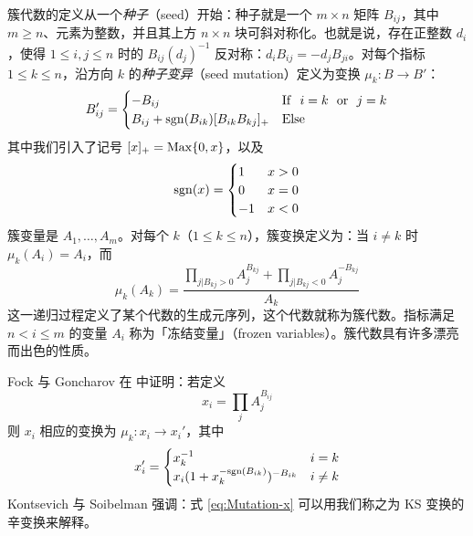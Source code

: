 簇代数的定义从一个\emph{种子}（seed）开始：种子就是一个 $m\times n$ 矩阵 $B_{ij}$，其中 $m\geq n$、元素为整数，并且其上方 $n\times n$ 块可斜对称化。也就是说，存在正整数 $d_i$，使得 $1\leq i,j\leq n$ 时的 $B_{ij}(d_j)^{-1}$ 反对称：$d_i B_{ij} = - d_j B_{ji}$。对每个指标 $1\leq k \leq n$，沿方向 $k$ 的\emph{种子变异}（seed mutation）定义为变换 $\mu_k: B\to B'$：
%
\begin{equation}\label{eq:seed-mtrx}
B'_{ij} = \begin{cases} - B_{ij} & {\rm If} ~~ i = k ~~ {\rm or}~~ j=k \\
B_{ij} + {\rm sgn}(B_{ik}) [B_{ik} B_{kj}]_+ & {\rm Else} \\
\end{cases}
\end{equation}
%
其中我们引入了记号 $[x]_+ = {\rm Max}\{ 0,x\}$，以及
%
\begin{equation}
{\rm sgn}(x) = \begin{cases} 1 & x>0 \\  0 & x =0 \\ -1 & x < 0 \\ \end{cases}
\end{equation}
%
簇变量是 $A_1, \dots, A_m$。对每个 $k$（$1\leq k \leq n$），簇变换定义为：当 $i\not= k$ 时 $\mu_k(A_i) = A_i$，而
%
\begin{equation}
\mu_k(A_k) = \frac{ \prod_{j\vert B_{kj}>0} A_j^{B_{kj}} + \prod_{j\vert B_{kj}<0} A_j^{-B_{kj}} }{A_k}
\end{equation}
%
这一递归过程定义了某个代数的生成元序列，这个代数就称为簇代数。指标满足 $n<i\leq m$ 的变量 $A_i$ 称为「冻结变量」（frozen variables）。簇代数具有许多漂亮而出色的性质。

Fock 与 Goncharov 在 \cite{MR2567745} 中证明：若定义
%
\begin{equation}
x_i = \prod_j A_j^{B_{ij} }
\end{equation}
%
则 $x_i$ 相应的变换为 $\mu_k: x_i \to x_i'$，其中
%
\begin{equation}\label{eq:Mutation-x}
 x_i' = \begin{cases}  x_k^{-1} & i=k \\
x_i (1+ x_k^{-{\rm sgn}(B_{ik})})^{-B_{ik}} & i \not= k \\
\end{cases}
\end{equation}
%
Kontsevich 与 Soibelman \cite{ks1} 强调：式 \eqref{eq:Mutation-x} 可以用我们称之为 KS 变换的辛变换来解释。

